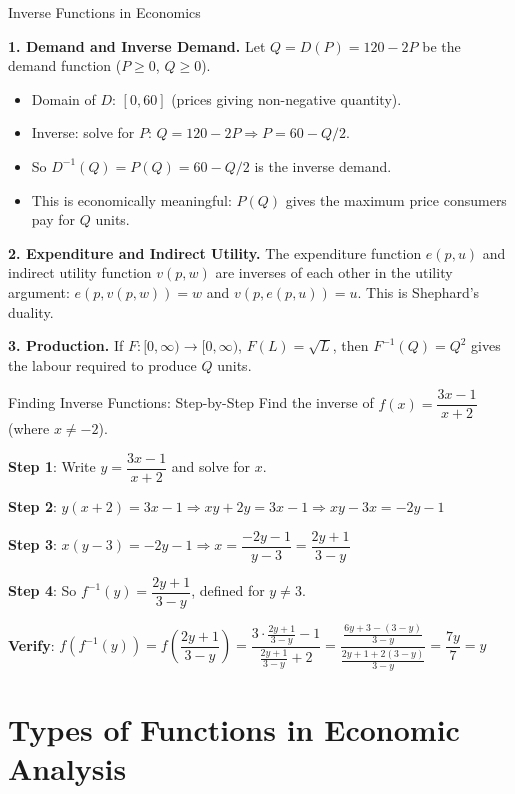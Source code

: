 \documentclass[12pt, a4paper]{article}
\theoremstyle{definition}
\begin{document}
\begin{exbox}{Inverse Functions in Economics}

\textbf{1. Demand and Inverse Demand.}
Let $Q = D(P) = 120 - 2P$ be the demand function ($P \geq 0$, $Q \geq 0$).
\begin{itemize}
  \item Domain of $D$: $[0, 60]$ (prices giving non-negative quantity).
  \item Inverse: solve for $P$: $Q = 120 - 2P \Rightarrow P = 60 - Q/2$.
  \item So $D^{-1}(Q) = P(Q) = 60 - Q/2$ is the inverse demand.
  \item This is economically meaningful: $P(Q)$ gives the maximum price consumers pay for $Q$ units.
\end{itemize}

\textbf{2. Expenditure and Indirect Utility.}
The expenditure function $e(p, u)$ and indirect utility function $v(p, w)$ are inverses of each other in the utility argument: $e(p, v(p,w)) = w$ and $v(p, e(p,u)) = u$. This is Shephard's duality.

\textbf{3. Production.} If $F: [0,\infty) \to [0,\infty)$, $F(L) = \sqrt{L}$, then $F^{-1}(Q) = Q^2$ gives the labour required to produce $Q$ units.
\end{exbox}

\begin{exbox}{Finding Inverse Functions: Step-by-Step}
Find the inverse of $f(x) = \dfrac{3x-1}{x+2}$ (where $x \neq -2$).

\textbf{Step 1}: Write $y = \dfrac{3x-1}{x+2}$ and solve for $x$.

\textbf{Step 2}: $y(x+2) = 3x-1 \Rightarrow xy + 2y = 3x - 1 \Rightarrow xy - 3x = -2y - 1$

\textbf{Step 3}: $x(y-3) = -2y-1 \Rightarrow x = \dfrac{-2y-1}{y-3} = \dfrac{2y+1}{3-y}$

\textbf{Step 4}: So $f^{-1}(y) = \dfrac{2y+1}{3-y}$, defined for $y \neq 3$.

\textbf{Verify}: $f(f^{-1}(y)) = f\!\left(\dfrac{2y+1}{3-y}\right) = \dfrac{3\cdot\frac{2y+1}{3-y}-1}{\frac{2y+1}{3-y}+2} = \dfrac{\frac{6y+3-(3-y)}{3-y}}{\frac{2y+1+2(3-y)}{3-y}} = \dfrac{7y}{7} = y$ \checkmark
\end{exbox}

\section{Types of Functions in Economic Analysis}
\end{document}

